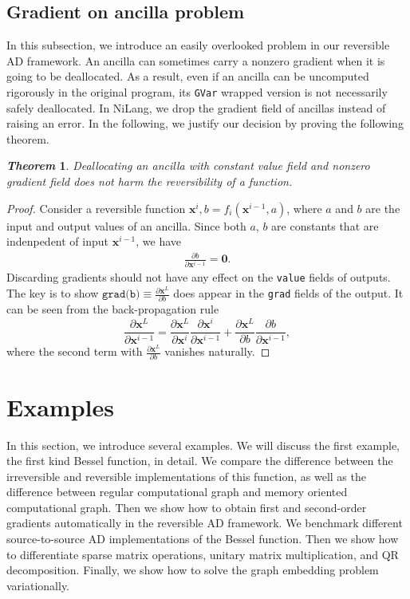 \documentclass{article}
\newcommand{\<}{\langle}
\renewcommand{\>}{\rangle}
\newcommand{\vx}{{\mathbf{x}}}
\newtheorem{theorem}{\textit{Theorem}}
\theoremstyle{definition}\newtheorem{definition}{\textit{Definition}}
\begin{document}
\subsection{Gradient on ancilla problem}
In this subsection, we introduce an easily overlooked problem in our reversible AD framework.
An ancilla can sometimes carry a nonzero gradient when it is going to be deallocated. As a result, even if an ancilla can be uncomputed rigorously in the original program, its \texttt{GVar} wrapped version is not necessarily safely deallocated.
In NiLang, we drop the gradient field of ancillas instead of raising an error.
In the following, we justify our decision by proving the following theorem.
\begin{theorem}
    Deallocating an ancilla with constant value field and nonzero gradient field does not harm the reversibility of a function.
\end{theorem}
\begin{proof}
    Consider a reversible function $\vx^i, b = f_i(\vx^{i-1}, a)$, where $a$ and $b$ are the input and output values of an ancilla.
    Since both $a$, $b$ are constants that are indenpedent of input $\vx^{i-1}$, we have
\begin{align}
    \frac{\partial b}{\partial \vx^{i-1}} = \mathbf{0}.
\end{align}
Discarding gradients should not have any effect on the \texttt{value} fields of outputs.
    The key is to show $\texttt{grad(b)} \equiv \frac{\partial \vx^L}{\partial{b}}$ does appear in the \texttt{grad} fields of the output. It can be seen from the back-propagation rule 
\begin{equation}
    \frac{\partial \vx^L}{\partial \vx^{i-1}} = \frac{\partial \vx^L}{\partial \vx^i}\frac{\partial \vx^i}{\partial \vx^{i-1}} + \frac{\partial \vx^L}{\partial b}\frac{\partial b}{\partial \vx^{i-1}},
\end{equation}
where the second term with $\frac{\partial \vx^L}{\partial{b}}$ vanishes naturally.
\end{proof}

\section{Examples}\label{sec:example}

In this section, we introduce several examples.
We will discuss the first example, the first kind Bessel function, in detail.
We compare the difference between the irreversible and reversible implementations of this function, as well as the difference between regular computational graph and memory oriented computational graph.
Then we show how to obtain first and second-order gradients automatically in the reversible AD framework.
We benchmark different source-to-source AD implementations of the Bessel function.
Then we show how to differentiate sparse matrix operations, unitary matrix multiplication, and QR decomposition.
Finally, we show how to solve the graph embedding problem variationally.
\end{document}
